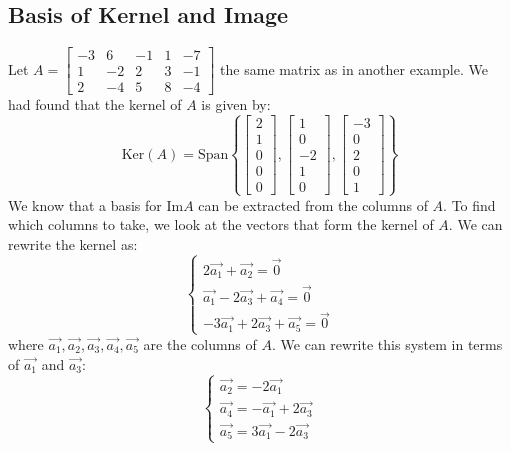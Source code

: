 \subsection{Basis of Kernel and Image}
\begin{eg}
    Let $A = \begin{bmatrix}
        -3 & 6 & -1 & 1 & -7 \\
        1 & -2 & 2 & 3 & -1 \\
        2 & -4 & 5 & 8 & -4
    \end{bmatrix}$ the same matrix as in another example. We had found that the kernel of $A$ is given by:
    \[ \text{Ker}(A) = \text{Span}\left\{ \begin{bmatrix}
        2 \\ 1 \\ 0 \\ 0 \\ 0
    \end{bmatrix}, \begin{bmatrix}
        1 \\ 0 \\ -2 \\ 1 \\ 0
    \end{bmatrix}, \begin{bmatrix}
        -3 \\ 0 \\ 2 \\ 0 \\ 1
    \end{bmatrix} \right\} \]
    We know that a basis for $\text{Im} A$ can be extracted from the columns of $A$. To find which columns to take, we look at the vectors that form the kernel of $A$. We can rewrite the kernel as:
    \[
        \begin{cases}
            2\vec{a_1} + \vec{a_2} = \vec{0} \\
            \vec{a_1} - 2\vec{a_3} + \vec{a_4} = \vec{0} \\
            -3\vec{a_1} + 2\vec{a_3} + \vec{a_5} = \vec{0}
        \end{cases}
    \]
    where $\vec{a_1}, \vec{a_2}, \vec{a_3}, \vec{a_4}, \vec{a_5}$ are the columns of $A$. We can rewrite this system in terms of $\vec{a_1}$ and $\vec{a_3}$:
    \[ \begin{cases}
        \vec{a_2} = -2\vec{a_1} \\
        \vec{a_4} = -\vec{a_1} + 2\vec{a_3} \\
        \vec{a_5} = 3\vec{a_1} - 2\vec{a_3}

\end{cases}\]
\end{eg}
